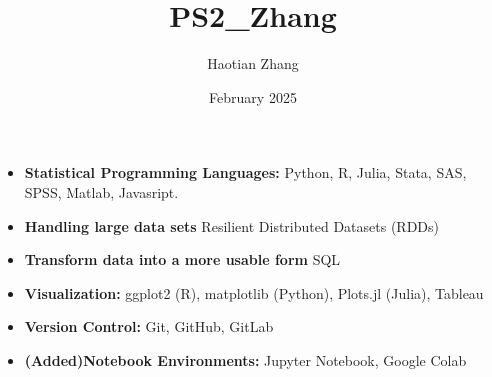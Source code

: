 \documentclass{article}
\title{PS2_Zhang}
\author{Haotian Zhang}
\date{February 2025}
\begin{document}
\maketitle
\begin{itemize}
    \item \textbf{Statistical Programming Languages:} Python, R, Julia, Stata, SAS, SPSS, Matlab, Javasript.
    \item \textbf{Handling large data sets} Resilient Distributed Datasets (RDDs)
    \item \textbf{Transform data into a more usable form} SQL
    \item \textbf{Visualization:} ggplot2 (R), matplotlib (Python), Plots.jl (Julia), Tableau
    \item \textbf{Version Control:} Git, GitHub, GitLab
    \item \textbf{(Added)Notebook Environments:} Jupyter Notebook, Google Colab
\end{itemize}
\end{document}
